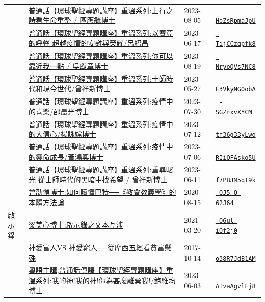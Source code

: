 \documentclass{book}
\begin{document}
{\begin{xltabular}{\textwidth}{|p{0.15\textwidth} p{0.6\textwidth}|p{0.07\textwidth} p{0.1\textwidth}|}
    & \hyperref[sec:HoZsRpmaJpU]{普通話【環球聖經專題講座】重溫系列:上行之詩看生命重整 / 區應毓博士} & 2023-08-05 & \href{https://youtube.com/watch?v=HoZsRpmaJpU}{\texttt{ HoZsRpmaJpU}} \\
    & \hyperref[sec:TijCCzqpfk8]{普通話【環球聖經專題講座】重溫系列:以賽亞的呼聲 超越疫情的安慰與榮耀/呂紹昌} & 2023-06-17 & \href{https://youtube.com/watch?v=TijCCzqpfk8}{\texttt{ TijCCzqpfk8}} \\
    & \hyperref[sec:NryoQVs7NC8]{普通話【環球聖經專題講座】重溫系列:你可以靠近我一點 / 吳獻章博士} & 2023-08-19 & \href{https://youtube.com/watch?v=NryoQVs7NC8}{\texttt{ NryoQVs7NC8}} \\
    & \hyperref[sec:E3VkyNG0obA]{普通話【環球聖經專題講座】重溫系列:士師時代和現今世代/曾祥新博士} & 2023-05-27 & \href{https://youtube.com/watch?v=E3VkyNG0obA}{\texttt{ E3VkyNG0obA}} \\
    & \hyperref[sec:_SGZrxvXYCM]{普通話【環球聖經專題講座】重溫系列:疫情中的喜樂/邵晨光博士} & 2023-07-30 & \href{https://youtube.com/watch?v=-SGZrxvXYCM}{\texttt{ -SGZrxvXYCM}} \\
    & \hyperref[sec:tf36g33yLwo]{普通話【環球聖經專題講座】重溫系列:疫情中的大信心/楊詠嫦博士} & 2023-07-12 & \href{https://youtube.com/watch?v=tf36g33yLwo}{\texttt{ tf36g33yLwo}} \\
    & \hyperref[sec:RIiOFAsko5U]{普通話【環球聖經專題講座】重溫系列:疫情中的靈命成長/黃鴻興博士} & 2023-07-06 & \href{https://youtube.com/watch?v=RIiOFAsko5U}{\texttt{ RIiOFAsko5U}} \\
    & \hyperref[sec:f7PBJM5qt9k]{普通話【環球聖經專題講座】重溫系列:重尋曙光 從士師時代的黑暗中找希望 / 曾祥新博士} & 2023-06-11 & \href{https://youtube.com/watch?v=f7PBJM5qt9k}{\texttt{ f7PBJM5qt9k}} \\
    & \hyperref[sec:QJ5_Q_62J64]{曾劭愷博士:如何讀懂巴特──《教會教義學》的本體方法論} & 2020-08-15 & \href{https://youtube.com/watch?v=QJ5_Q-62J64}{\texttt{ QJ5\_Q-62J64}} \\
啟示錄   & \hyperref[sec:O6ul_iQf2j0]{梁美心博士:啟示錄之文本互涉} & 2021-03-20 & \href{https://youtube.com/watch?v=O6ul-iQf2j0}{\texttt{ O6ul-iQf2j0}} \\
    & \hyperref[sec:o38R7JdB1AM]{神愛富人VS 神愛窮人──從摩西五經看貧富懸殊} & 2017-10-14 & \href{https://youtube.com/watch?v=o38R7JdB1AM}{\texttt{ o38R7JdB1AM}} \\
    & \hyperref[sec:ATvaAgvlFj8]{粵語主講,普通話傳譯【環球聖經專題講座】重溫系列:我的神!我的神!你為甚麼離棄我!/鮑維均博士} & 2023-06-03 & \href{https://youtube.com/watch?v=ATvaAgvlFj8}{\texttt{ ATvaAgvlFj8}} \\

\end{xltabular}}
\end{document}
